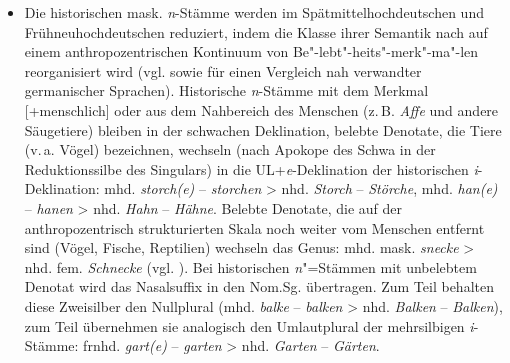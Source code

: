 \begin{itemize}
\item Die historischen mask. \textit{n}{}-Stämme werden im Spätmittelhochdeutschen und Frühneuhochdeutschen reduziert, indem die Klasse ihrer Semantik nach auf einem anthropozentrischen Kontinuum von Be"-lebt"-heits"-merk"-ma"-len reorganisiert wird (vgl. \citealt{Köpcke2000a} sowie \citealt{Kürschner2021} für einen Vergleich nah verwandter germanischer Sprachen). Historische \textit{n}{}-Stämme mit dem Merkmal [+menschlich] oder aus dem Nahbereich des Menschen (z.\,B. \textit{Affe} und andere Säugetiere) bleiben in der schwachen Deklination, belebte Denotate, die Tiere (v.\,a. Vögel) bezeichnen, wechseln (nach Apokope des Schwa in der Reduktionssilbe des Singulars) in die UL+\textit{e}{}-Deklination der historischen \textit{i}{}-Deklination: mhd. \textit{storch(e)} -- \textit{storchen} > nhd. \textit{Storch} -- \textit{Störche}, mhd. \textit{han(e)} -- \textit{hanen} > nhd. \textit{Hahn} -- \textit{Hähne}. Belebte Denotate, die auf der anthropozentrisch strukturierten Skala noch weiter vom Menschen entfernt sind (Vögel, Fische, Reptilien) wechseln das Genus: mhd. mask. \textit{snecke} > nhd. fem. \textit{Schnecke} (vgl. \citealt[§55]{Paul1968}). Bei historischen \textit{n}"=Stämmen mit unbelebtem Denotat wird das Nasalsuffix in den Nom.Sg. übertragen. Zum Teil behalten diese Zweisilber den Nullplural (mhd. \textit{balke} -- \textit{balken} > nhd. \textit{Balken} -- \textit{Balken}), zum Teil übernehmen sie analogisch den Umlautplural der mehrsilbigen \textit{i}{}-Stämme: frnhd. \textit{gart(e)} -- \textit{garten} > nhd. \textit{Garten} -- \textit{Gärten}.
\end{itemize}

